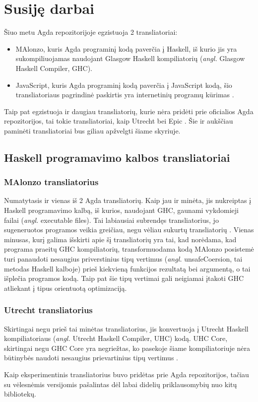 \documentclass{VUMIFPSbakalaurinis}
\begin{document}
\section{Susiję darbai}
Šiuo metu Agda repozitorijoje egzistuoja 2 transliatoriai: 
\begin{itemize}
	\item MAlonzo, kuris Agda programinį kodą paverčia į Haskell, iš kurio jis yra sukompiliuojamas naudojant Glasgow Haskell kompiliatorių (\textit{angl.} Glasgow Haskell Compiler, GHC).
	\item JavaScript, kuris Agda programinį kodą paverčia į JavaScript kodą, šio transliatoriaus pagrindinė paskirtis yra internetinių programų kūrimas \cite{html_agda}.
\end{itemize}
Taip pat egzistuoja ir daugiau transliatorių, kurie nėra pridėti prie oficialios Agda repozitorijos, tai tokie transliatoriai, kaip Utrecht bei Epic \cite{Utrecht,Epic}. Šie ir aukščiau paminėti transliatoriai bus giliau apžvelgti šiame skyriuje.
\subsection{Haskell programavimo kalbos transliatoriai}
\subsubsection{MAlonzo transliatorius}
Numatytasis ir vienas iš 2 Agda transliatorių. Kaip jau ir minėta, jis nukreiptas į Haskell programavimo kalbą, iš kurios, naudojant GHC, gaunami vykdomieji failai (\textit{angl.} executable files). Tai labiausiai subrendęs transliatorius, jo sugeneruotos programos veikia greičiau, negu vėliau sukurtų transliatorių \cite{Utrecht,Epic}. Vienas minusas, kurį galima išskirti apie šį transliatorių yra tai, kad norėdama, kad programa praeitų GHC kompiliatorių, transformuodama kodą MAlonzo posistemė turi panaudoti nesaugius priverstinius tipų vertimus (\textit{angl.} unsafeCoersion, tai metodas Haskell kalboje) prieš kiekvieną funkcijos rezultatą bei argumentą, o tai išplečia programos kodą. Taip pat šie tipų vertimai gali neigiamai įtakoti GHC atliekant į tipus orientuotą optimizaciją.

\subsubsection{Utrecht transliatorius}
Skirtingai negu prieš tai minėtas transliatorius, jis konvertuoja į Utrecht Haskell kompiliatoriaus (\textit{angl.} Utrecht Haskell Compiler, UHC) kodą. UHC Core, skirtingai negu GHC Core yra negriežtas, ko pasekoje šiame kompiliatoriuje nėra būtinybės naudoti nesaugius prievartinius tipų vertimus \cite{Utrecht}.\par Kaip eksperimentinis transliatorius buvo pridėtas prie Agda repozitorijos, tačiau su vėlesnėmis versijomis pašalintas dėl labai didelių priklausomybių nuo kitų bibliotekų.
\end{document}
